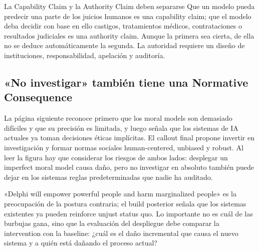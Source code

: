 
\begin{importantbox}{La Capability Claim y la Authority Claim deben separarse}
Que un modelo pueda predecir una parte de los juicios humanos es una capability claim; que el modelo deba decidir con base en ello castigos, tratamientos médicos, contrataciones o resultados judiciales es una authority claim. Aunque la primera sea cierta, de ella no se deduce automáticamente la segunda. La autoridad requiere un diseño de instituciones, responsabilidad, apelación y auditoría.
\end{importantbox}

\subsection{«No investigar» también tiene una Normative Consequence}

La página siguiente reconoce primero que los moral models son demasiado difíciles y que su precisión es limitada, y luego señala que los sistemas de IA actuales ya toman decisiones éticas implícitas. El callout final propone invertir en investigación y formar normas sociales human-centered, unbiased y robust. Al leer la figura hay que considerar los riesgos de ambos lados: desplegar un imperfect moral model causa daño, pero no investigar en absoluto también puede dejar en los sistemas reglas predeterminadas que nadie ha auditado.


«Delphi will empower powerful people and harm marginalized people» es la preocupación de la postura contraria; el build posterior señala que los sistemas existentes ya pueden reinforce unjust status quo. Lo importante no es cuál de las burbujas gana, sino que la evaluación del despliegue debe comparar la intervention con la baseline: ¿cuál es el daño incremental que causa el nuevo sistema y a quién está dañando el proceso actual?


